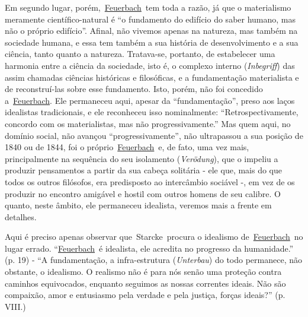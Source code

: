 Em segundo lugar,
porém,~\href{https://www.marxists.org/portugues/dicionario/verbetes/f/feuerbach.htm}{Feuerbach}~tem
toda a razão, já que o materialismo meramente científico-natural é ``o
fundamento do edifício do saber humano, mas não o próprio edifício''.
Afinal, não vivemos apenas na natureza, mas também na sociedade humana,
e essa tem também a sua história de desenvolvimento e a sua ciência,
tanto quanto a natureza. Tratava-se, portanto, de estabelecer uma
harmonia entre a ciência da sociedade, isto é, o complexo interno
(\emph{Inbegriff}) das assim chamadas ciências históricas e filosóficas,
e a fundamentação materialista e de reconstruí-las sobre esse
fundamento. Isto, porém, não foi concedido
a~\href{https://www.marxists.org/portugues/dicionario/verbetes/f/feuerbach.htm}{Feuerbach}.
Ele permaneceu aqui, apesar da ``fundamentação'', preso aos laços
idealistas tradicionais, e ele reconheceu isso nominalmente:
``Retrospectivamente, concordo com os materialistas, mas não
progressivamente.'' Mas quem aqui, no domínio social, não avançou
``progressivamente'', não ultrapassou a sua posição de 1840 ou de 1844,
foi o
próprio~\href{https://www.marxists.org/portugues/dicionario/verbetes/f/feuerbach.htm}{Feuerbach}~e,
de fato, uma vez mais, principalmente na sequência do seu isolamento
(\emph{Verödung}), que o impeliu a produzir pensamentos a partir da sua
cabeça solitária - ele que, mais do que todos os outros filósofos, era
predisposto ao intercâmbio sociável -, em vez de os produzir no encontro
amigável e hostil com outros homens de seu calibre. O quanto, neste
âmbito, ele permaneceu idealista, veremos mais a frente em detalhes.

Aqui é preciso apenas observar que~Starcke~procura o idealismo
de~\href{https://www.marxists.org/portugues/dicionario/verbetes/f/feuerbach.htm}{Feuerbach}~no
lugar errado.
``\href{https://www.marxists.org/portugues/dicionario/verbetes/f/feuerbach.htm}{Feuerbach}~é
idealista, ele acredita no progresso da humanidade.'' (p. 19) - ``A
fundamentação, a infra-estrutura (\emph{Unterbau}) do todo permanece,
não obstante, o idealismo. O realismo não é para nós senão uma proteção
contra caminhos equivocados, enquanto seguimos as nossas correntes
ideais. Não são compaixão, amor e entusiasmo pela verdade e pela
justiça, forças ideais?'' (p. VIII.)

